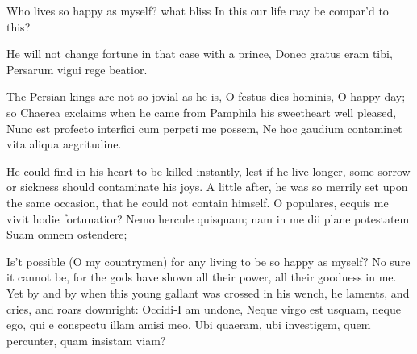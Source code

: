 Who lives so happy as myself? what bliss
In this our life may be compar'd to this?

He will not change fortune in that case with a prince,
Donec gratus eram tibi,
Persarum vigui rege beatior.

The Persian kings are not so jovial as he is, O festus dies
hominis, O happy day; so Chaerea exclaims when he came from Pamphila
his sweetheart well pleased,
Nunc est profecto interfici cum perpeti me possem,
Ne hoc gaudium contaminet vita aliqua aegritudine.

He could find in his heart to be killed instantly, lest if he live
longer, some sorrow or sickness should contaminate his joys. A little
after, he was so merrily set upon the same occasion, that he could not
contain himself.
O populares, ecquis me vivit hodie fortunatior?
Nemo hercule quisquam; nam in me dii plane potestatem
Suam omnem ostendere;

Is't possible (O my countrymen) for any living to be so happy as
myself? No sure it cannot be, for the gods have shown all their power,
all their goodness in me. Yet by and by when this young gallant was
crossed in his wench, he laments, and cries, and roars downright:
Occidi-I am undone,
Neque virgo est usquam, neque ego, qui e conspectu illam amisi meo,
Ubi quaeram, ubi investigem, quem percunter, quam insistam viam?

